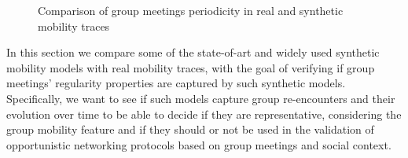 \documentclass[10pt, conference, letterpaper]{IEEEtran}
\begin{document}
\begin{figure}[!t]
\centering
\caption{Comparison of group meetings periodicity in real and synthetic mobility traces}\label{periodicity}
\end{figure}

In this section we compare some of the state-of-art and widely used synthetic mobility models with real mobility traces, with the goal of verifying if group meetings' regularity properties are captured by such synthetic models. Specifically, we want to see if such models capture group re-encounters and their evolution over time to be able to decide if they are representative, considering the group mobility feature and if they should or not be used in the validation of opportunistic networking protocols based on group meetings and social context.
\end{document}
